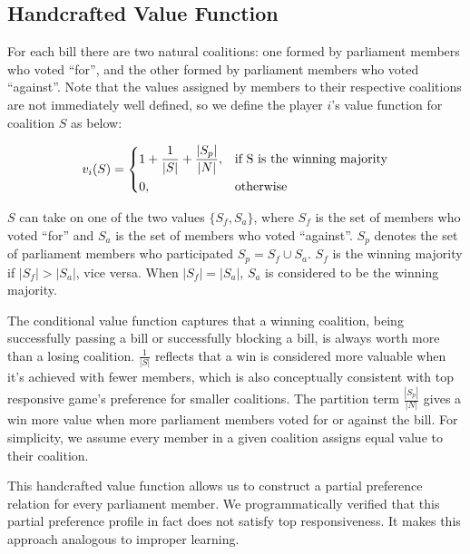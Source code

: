 \documentclass[letterpaper]{article} %
\theoremstyle{definition}
\begin{document}
\subsection{Handcrafted Value Function}
For each bill there are two natural coalitions: one formed by parliament members who voted ``for'', and the other formed by parliament members who voted ``against''. Note that the values assigned by members to their respective coalitions are not immediately well defined, so we define the player $i$'s value function for coalition $S$ as below:

\[
  v_i(S) = 
  \begin{dcases}
      1 + \frac{1}{|S|} + \frac{|S_p|}{|N|},& \text{if S is the winning majority}\\
      0,              & \text{otherwise}
  \end{dcases}
\]

$S$ can take on one of the two values $\{S_f, S_a\}$, where $S_f$ is the set of members who voted ``for'' and $S_a$ is the set of members who voted ``against''. $S_p$ denotes the set of parliament members who participated $S_p = S_f \cup S_a$. $S_f$ is the winning majority if $|S_f| > |S_a|$, vice versa. When $|S_f| = |S_a|$, $S_a$ is considered to be the winning majority.

The conditional value function captures that a winning coalition, being successfully passing a bill or successfully blocking a bill, is always worth more than a losing coalition. $\frac{1}{|S|}$ reflects that a win is considered more valuable when it's achieved with fewer members, which is also conceptually consistent with top responsive game's preference for smaller coalitions. The partition term $\frac{|S_p|}{|N|}$ gives a win more value when more parliament members voted for or against the bill. For simplicity, we assume every member in a given coalition assigns equal value to their coalition.

This handcrafted value function allows us to construct a partial preference relation for every parliament member. We programmatically verified that this partial preference profile in fact does not satisfy top responsiveness. It makes this approach analogous to improper learning.
\end{document}
